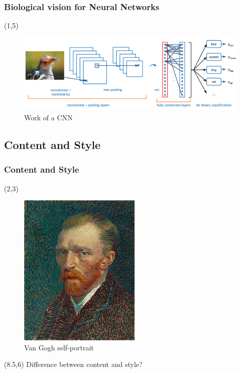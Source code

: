 \documentclass{beamer} %
\begin{document}
\begin{frame}

\frametitle{Biological vision for Neural Networks}
\begin{textblock}{5}(1,5)
	\begin{figure}
	\includegraphics[scale=0.65]{figures/Conv.png}
	\caption{Work of a CNN}
	\end{figure}
 \end{textblock} 


\end{frame}


\subsection{Content and Style}
\begin{frame}
\frametitle{Content and Style}

\begin{textblock}{4}(2,3)
	\begin{figure}
	\includegraphics[scale=0.8]{figures/goth}
	\caption{Van Gogh self-portrait }
	
	\end{figure}
	
 \end{textblock} 

\begin{textblock}{6}(8.5,6)
	Difference between content and style?
 \end{textblock} 


\end{frame}
\end{document}
